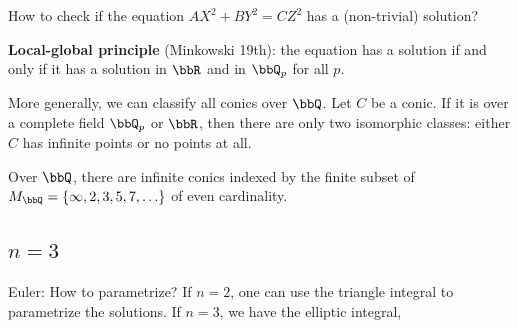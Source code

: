     How to check if the equation \(AX^2 + BY^2 = CZ^2\) has a (non-trivial) solution?
    
    \textbf{Local-global principle} (Minkowski 19th): the equation has a solution if and only if it has a solution in \(\bbR\) and in \(\bbQ_p\) for all \(p\).
    
    More generally, we can classify all conics over \(\bbQ\).
    Let \(C\) be a conic. 
    If it is over a complete field \(\bbQ_p\) or \(\bbR\), then there are only two isomorphic classes: either \(C\) has infinite points or no points at all.

    Over \(\bbQ\), there are infinite conics indexed by the finite subset of \(M_\bbQ = \{\infty, 2,3,5,7,\ldots\}\) of even cardinality.

\subsection[n=3]{\(n=3\)}

    Euler: How to parametrize?
    If \(n=2\), one can use the triangle integral to parametrize the solutions.
    If \(n=3\), we have the elliptic integral, 
